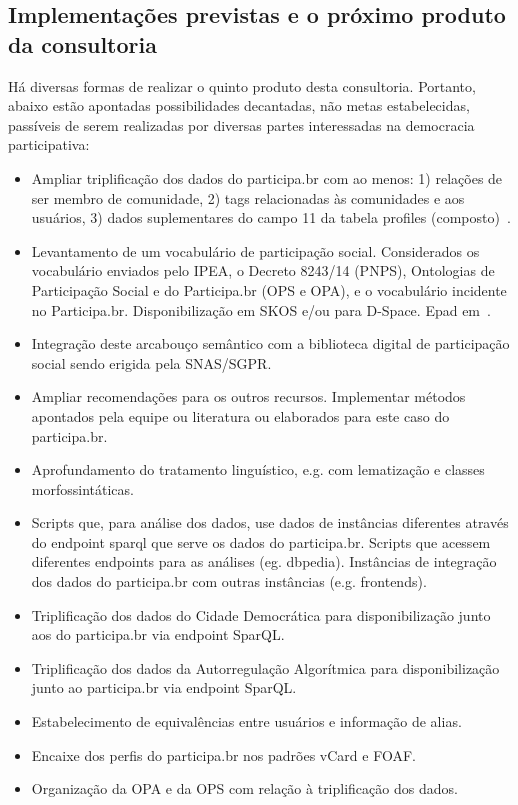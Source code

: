 \documentclass[12pt]{article}
\begin{document}
\subsection{Implementações previstas e o próximo produto da consultoria}
Há diversas formas de realizar o quinto produto desta consultoria. Portanto, abaixo estão apontadas possibilidades decantadas, não metas estabelecidas, passíveis de serem realizadas por diversas partes interessadas na democracia participativa:
\begin{itemize}
    \item Ampliar triplificação dos dados do participa.br com ao menos: 1) relações de ser membro de comunidade, 2) tags relacionadas às comunidades e aos usuários, 3) dados suplementares do campo 11 da tabela profiles (composto)~\cite{bd}.
    \item Levantamento de um vocabulário de participação social. Considerados os vocabulário enviados pelo IPEA, o Decreto 8243/14 (PNPS), Ontologias de Participação Social e do Participa.br (OPS e OPA), e o vocabulário incidente no Participa.br. Disponibilização em SKOS e/ou para D-Space. Epad em~\cite{padVoc}.
    \item Integração deste arcabouço semântico com a biblioteca digital de participação social sendo erigida pela SNAS/SGPR.
    \item Ampliar recomendações para os outros recursos. Implementar métodos apontados pela equipe ou literatura ou elaborados para este caso do participa.br.
    \item Aprofundamento do tratamento linguístico, e.g. com lematização e classes morfossintáticas.
    \item Scripts que, para análise dos dados, use dados de instâncias diferentes através do endpoint sparql que serve os dados do participa.br. Scripts que acessem diferentes endpoints para as análises (eg. dbpedia). Instâncias de integração dos dados do participa.br com outras instâncias (e.g. frontends).
    \item Triplificação dos dados do Cidade Democrática para disponibilização junto aos do participa.br via endpoint SparQL.
    \item Triplificação dos dados da Autorregulação Algorítmica para disponibilização junto ao participa.br via endpoint SparQL.
    \item Estabelecimento de equivalências entre usuários e informação de alias.
    \item Encaixe dos perfis do participa.br nos padrões vCard e FOAF.
    \item Organização da OPA e da OPS com relação à triplificação dos dados.

\end{itemize}
\end{document}
